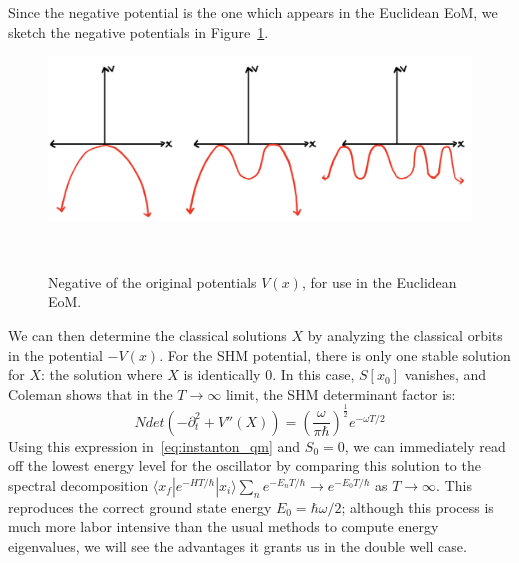 \documentclass[11pt, oneside]{article}   	%
\theoremstyle{definition}
\begin{document}
Since the negative potential is the one which appears in the Euclidean EoM, we sketch the negative potentials in 
Figure~\ref{fig:negative_potentials}. 
\begin{figure}[H]
	\centering
	\includegraphics[width = .9\textwidth]{instanton_minus_potentials}
	\caption{Negative of the original potentials $V(x)$, for use in the Euclidean EoM.}~
	\label{fig:negative_potentials}
\end{figure}
We can then determine the classical solutions $X$ by analyzing the classical orbits in the potential $-V(x)$. For the SHM potential, 
there is only one stable solution for $X$: the solution where $X$ is identically 0. In this case, $S[x_0]$ vanishes, and Coleman shows 
that in the $T\rightarrow\infty$ limit, the SHM determinant factor is:
\begin{equation}
	N det(-\partial_t^2 + V''(X)) = \left(\frac{\omega}{\pi\hbar}\right)^{\frac{1}{2}} e^{-\omega T / 2}
\end{equation}
Using this expression in~\ref{eq:instanton_qm} and $S_0 = 0$, we can immediately read off the lowest energy level for the oscillator 
by comparing this solution to the spectral decomposition $\langle x_f | e^{-HT / \hbar} | x_i\rangle \sum_n e^{-E_n T / \hbar} \rightarrow e^{-E_0T / \hbar}$ as 
$T\rightarrow\infty$. This reproduces the correct ground state energy $E_0 = \hbar\omega / 2$; although this process is much more labor 
intensive than the usual methods to compute energy eigenvalues, we will see the advantages it grants us in the double well case. 
\end{document}
